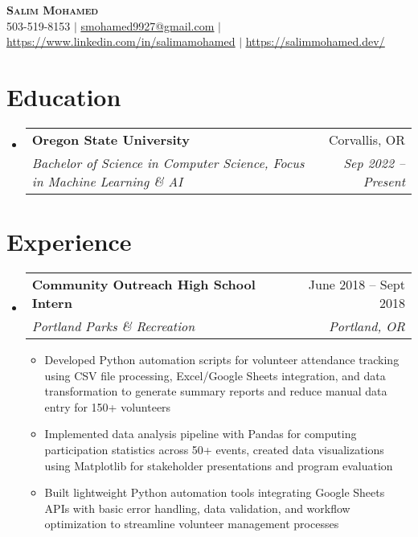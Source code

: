 \documentclass[letterpaper,11pt]{article}
\makeatletter
\newcommand{\resumeItem}[1]{
  \item\small{
    {#1 \vspace{-2pt}}
  }
}
\newcommand{\resumeSubheading}[4]{
  \vspace{-2pt}\item
    \begin{tabular*}{0.97\textwidth}[t]{l@{\extracolsep{\fill}}r}
      \textbf{#1} & #2 \\
      \textit{\small#3} & \textit{\small #4} \\
    \end{tabular*}\vspace{-7pt}
}
\newcommand{\resumeSubHeadingListStart}{\begin{itemize}[leftmargin=0.15in, label={}]}
\newcommand{\resumeSubHeadingListEnd}{\end{itemize}}
\newcommand{\resumeItemListStart}{\begin{itemize}}
\newcommand{\resumeItemListEnd}{\end{itemize}\vspace{-5pt}}
\makeatother
\begin{document}
\begin{center}
    \textbf{\Huge \scshape Salim Mohamed} \\ \vspace{1pt}
    \small 503-519-8153 $|$ \href{mailto:smohamed9927@gmail.com}{\underline{smohamed9927@gmail.com}} $|$ 
    \href{https://www.linkedin.com/in/salimamohamed}{\underline{https://www.linkedin.com/in/salimamohamed}} $|$
    \href{https://salimmohamed.dev/}{\underline{https://salimmohamed.dev/}}
\end{center}


\section{Education}
  \resumeSubHeadingListStart
    \resumeSubheading
      {Oregon State University}{Corvallis, OR}
      {Bachelor of Science in Computer Science, Focus in Machine Learning \& AI}{Sep 2022 -- Present}
  \resumeSubHeadingListEnd


\section{Experience}
  \resumeSubHeadingListStart
      
    \resumeSubheading
      {Community Outreach High School Intern}{June 2018 -- Sept 2018}
      {Portland Parks \& Recreation}{Portland, OR}
      \resumeItemListStart
        \resumeItem{Developed Python automation scripts for volunteer attendance tracking using CSV file processing, Excel/Google Sheets integration, and data transformation to generate summary reports and reduce manual data entry for 150+ volunteers}
        \resumeItem{Implemented data analysis pipeline with Pandas for computing participation statistics across 50+ events, created data visualizations using Matplotlib for stakeholder presentations and program evaluation}
        \resumeItem{Built lightweight Python automation tools integrating Google Sheets APIs with basic error handling, data validation, and workflow optimization to streamline volunteer management processes}
    \resumeItemListEnd

  \resumeSubHeadingListEnd
\end{document}
